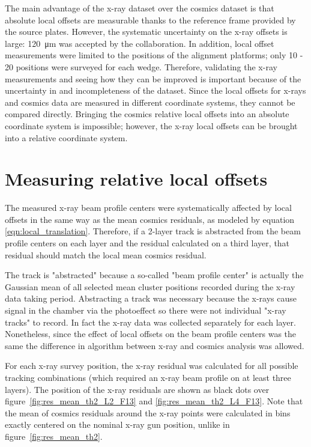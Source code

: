 The main advantage of the x-ray dataset over the cosmics dataset is that absolute local offsets are measurable thanks to the reference frame provided by the source plates. However, the systematic uncertainty on the x-ray offsets is large: \SI{120}{\micro\meter} was accepted by the collaboration. In addition, local offset measurements were limited to the positions of the alignment platforms; only 10 - 20 positions were surveyed for each wedge. Therefore, validating the x-ray measurements and seeing how they can be improved is important because of the uncertainty in and incompleteness of the dataset. Since the local offsets for x-rays and cosmics data are measured in different coordinate systems, they cannot be compared directly. Bringing the cosmics relative local offsets into an absolute coordinate system is impossible; however, the x-ray local offsets can be brought into a relative coordinate system.

\section{Measuring relative local offsets}
The measured x-ray beam profile centers were systematically affected by local offsets in the same way as the mean cosmics residuals, as modeled by equation \ref{eqn:local_translation}. Therefore, if a 2-layer track is abstracted from the beam profile centers on each layer and the residual calculated on a third layer, that residual should match the local mean cosmics residual. 

The track is "abstracted" because a so-called "beam profile center" is actually the Gaussian mean of all selected mean cluster positions recorded during the x-ray data taking period. Abstracting a track was necessary because the x-rays cause signal in the chamber via the photoeffect so there were not individual "x-ray tracks" to record. In fact the x-ray data was collected separately for each layer. Nonetheless, since the effect of local offsets on the beam profile centers was the same the difference in algorithm between x-ray and cosmics analysis was allowed. 

For each x-ray survey position, the x-ray residual was calculated for all possible tracking combinations (which required an x-ray beam profile on at least three layers). The position of the x-ray residuals are shown as black dots over figure~\ref{fig:res_mean_th2_L2_F13} and \ref{fig:res_mean_th2_L4_F13}. Note that the mean of cosmics residuals around the x-ray points were calculated in bins exactly centered on the nominal x-ray gun position, unlike in figure~\ref{fig:res_mean_th2}.

